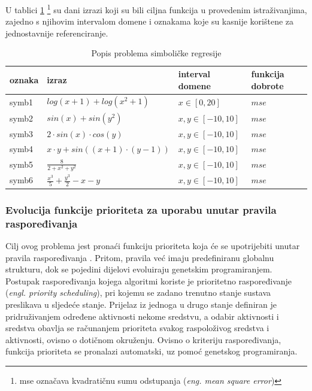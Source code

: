 U tablici \ref{bla} \footnote{mse označava kvadratičnu sumu odstupanja (\textit{eng. mean square error})} su dani izrazi koji su bili ciljna funkcija u provedenim istraživanjima, zajedno s njihovim intervalom domene i oznakama koje su kasnije korištene za jednostavnije referenciranje.

\begin{table}[H]
 	\centering

    \begin{tabular}{| l | l | l | l |}
    \hline
    oznaka & izraz & interval domene & funkcija dobrote\\ \hline
    symb1 & $log(x+1)+log(x^2+1)$ & $x \in [0, 20]$ & $mse$ \\ \hline
    symb2 & $sin(x) + sin(y^2)$ & $x, y \in [-10, 10]$ & $mse$\\ \hline
    symb3 & $2 \cdot sin(x) \cdot cos(y)$ & $x, y \in [-10, 10]$ & $mse$\\ \hline
    symb4 & $x \cdot y + sin((x+1) \cdot (y-1))$ & $x, y \in [-10, 10]$ & $mse$\\ \hline
    symb5 & \Large{ $\frac{8}{2 + x^2 + y^2}$ }& $x, y \in [-10, 10]$ & $mse$\\ \hline
    symb6 & $\frac{x^3}{5} + \frac{y^3}{2} - x - y$ & $x, y \in [-10, 10]$ & $mse$\\ \hline
    \end{tabular}
    
    \caption{Popis problema simboličke regresije}
    \label{bla}
\end{table}

\subsubsection{Evolucija funkcije prioriteta za uporabu unutar pravila raspoređivanja}
Cilj ovog problema jest pronaći funkciju prioriteta koja će se upotrijebiti unutar pravila raspoređivanja \cite{jakobovic}. Pritom, pravila već imaju predefiniranu globalnu strukturu, dok se pojedini dijelovi evoluiraju genetskim programiranjem. Postupak raspoređivanja kojega algoritmi koriste je prioritetno raspoređivanje (\textit{engl. priority scheduling}), pri kojemu se zadano trenutno stanje sustava preslikava u sljedeće stanje. Prijelaz iz jednoga u drugo stanje definiran je pridruživanjem određene aktivnosti nekome sredstvu, a odabir aktivnosti i sredstva obavlja se računanjem prioriteta svakog raspoloživog sredstva i aktivnosti, ovisno o dotičnom okruženju. Ovisno o kriteriju raspoređivanja, funkcija prioriteta se pronalazi automatski, uz pomoć genetskog programiranja.


